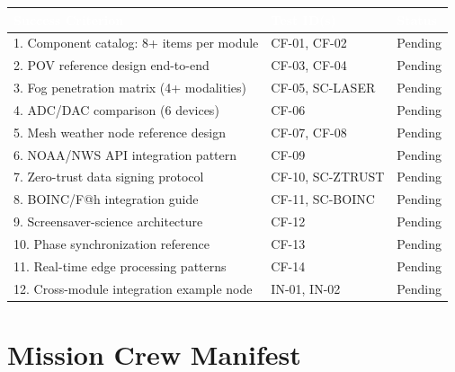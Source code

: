 \documentclass[11pt,letterpaper]{article}
\newcommand{\tableheader}[1]{\textbf{\sffamily\textcolor{white}{#1}}}
\begin{document}
\begin{center}
\begin{tabularx}{\textwidth}{XL{3.5cm}C{1.5cm}}
\toprule
{}
\tableheader{Success Criterion} & \tableheader{Test ID(s)} & \tableheader{Status} \\
. Component catalog: 8+ items per module & CF-01, CF-02 & Pending \\
2. POV reference design end-to-end & CF-03, CF-04 & Pending \\
3. Fog penetration matrix (4+ modalities) & CF-05, SC-LASER & Pending \\
4. ADC/DAC comparison (6 devices) & CF-06 & Pending \\
5. Mesh weather node reference design & CF-07, CF-08 & Pending \\
6. NOAA/NWS API integration pattern & CF-09 & Pending \\
7. Zero-trust data signing protocol & CF-10, SC-ZTRUST & Pending \\
8. BOINC/F@h integration guide & CF-11, SC-BOINC & Pending \\
9. Screensaver-science architecture & CF-12 & Pending \\
10. Phase synchronization reference & CF-13 & Pending \\
11. Real-time edge processing patterns & CF-14 & Pending \\
12. Cross-module integration example node & IN-01, IN-02 & Pending \\
\bottomrule
\end{tabularx}
\end{center}

\section{Mission Crew Manifest}
\end{document}
